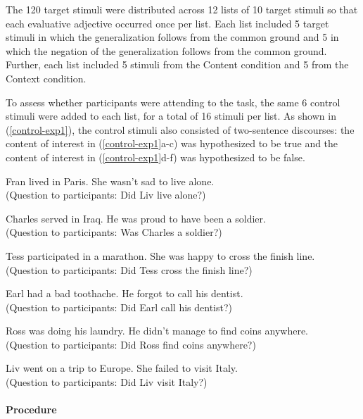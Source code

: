 \documentclass[11pt,fleqn]{article}
\newcommand{\6}{\mbox{$[\hspace*{-.6mm}[$}}
\newcommand{\9}{\mbox{$]\hspace*{-.6mm}]$}}
\begin{document}
The 120 target stimuli were distributed across 12 lists of 10 target stimuli so that each evaluative adjective occurred once per list. Each list included 5 target stimuli in which the generalization follows from the common ground and 5 in which the negation of the generalization follows from the common ground. Further, each list included 5 stimuli from the Content condition and 5 from the Context condition.

To assess whether participants were attending to the task, the same 6 control stimuli were added to each list, for a total of 16 stimuli per list. As shown in (\ref{control-exp1}), the control stimuli also consisted of two-sentence discourses: the content of interest in (\ref{control-exp1}a-c) was hypothesized to be true and the content of interest in (\ref{control-exp1}d-f) was hypothesized to be false.

\begin{exe}
\ex\label{control-exp1} 

\begin{xlist}

\ex Fran lived in Paris. She wasn't sad to live alone. \\ (Question to participants: Did Liv live alone?)

\ex Charles served in Iraq. He was proud to have been a soldier. \\ (Question to participants: Was Charles a soldier?)

\ex Tess participated in a marathon. She was happy to cross the finish line. \\ (Question to participants: Did Tess cross the finish line?)


\ex Earl had a bad toothache. He forgot to
call his dentist. \\ (Question to participants: Did Earl call his
dentist?)

\ex Ross was doing his laundry. He didn't manage to find coins anywhere. \\ (Question to participants: Did Ross find coins anywhere?)

\ex Liv went on a trip to Europe. She failed to visit Italy. \\
(Question to participants: Did Liv visit Italy?)

\end{xlist}
\end{exe}

\paragraph{Procedure}
\end{document}
